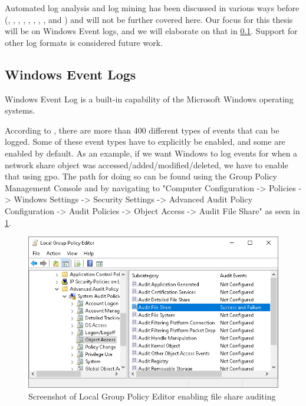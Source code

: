 Automated log analysis and log mining has been discussed in various ways before (\textcite{xu_2009}, \textcite{fu_2009}, \textcite{he_2016}, \textcite{Beschastnikh_2011}, \textcite{Shang_2013}, \textcite{Yuan_2012}, \textcite{Nagaraj_2012}, \textcite{Oprea_2015}, and \textcite{Gu_2015}) and will not be further covered here. Our focus for this thesis will be on Windows Event logs, and we will elaborate on that in \cref{sub:windows-event-logs}. Support for other log formats is considered future work.


\subsection{Windows Event Logs}
\label{sub:windows-event-logs}

Windows Event Log is a built-in capability of the Microsoft Windows operating systems.

According to \textcite{UltimateWindowsSecurity}, there are more than 400 different types of events that can be logged. Some of these event types have to explicitly be enabled, and some are enabled by default. As an example, if we want Windows to log events for when a network share object was accessed/added/modified/deleted, we have to enable that using \acrfull{gpo}. The path for doing so can be found using the Group Policy Management Console and by navigating to "Computer Configuration -> Policies -> Windows Settings -> Security Settings -> Advanced Audit Policy Configuration -> Audit Policies -> Object Access -> Audit File Share" as seen in \cref{fig:audit-file-share}.

\begin{figure}[htbp]  %
  \centering
  \includegraphics[width=\textwidth]{figures/audit-file-share.png}
  \caption[Screenshot of Local Group Policy Editor]{Screenshot of Local Group Policy Editor enabling file share auditing}
  \label{fig:audit-file-share}
\end{figure}

